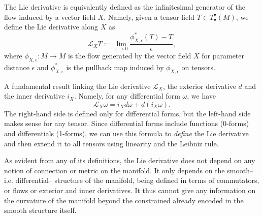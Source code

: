 \begin{mytheorem}
The Lie derivative is equivalently defined as the infinitesimal generator of the flow induced by a vector field \(X\).
Namely, given a tensor field \(T\in T^{\bullet}_{\bullet} (M)\), we define the Lie derivative along \(X\) as
\begin{equation}
    \mathcal{L}_X T := \lim_{\epsilon \to 0} \frac{\phi_{X,\epsilon}^* (T) - T}{ \epsilon},
\end{equation}
where \(\phi_{X,\epsilon}: M \to M\) is the flow generated by the vector field \(X\) for parameter distance \(\epsilon\) and \(\phi_{X,\epsilon}^*\) is the pullback map induced by \(\phi_{X,\epsilon}\) on tensors.
\end{mytheorem}


\begin{mytheorem}
A fundamental result linking the Lie derivative $\mathcal{L}_X$, the exterior derivative $d$ and the inner derivative $i_X$.
Namely, for any differential form $\omega$, we have
\begin{equation}
    \mathcal{L}_X \omega = i_X d \omega + d (i_X \omega).
\end{equation}
The right-hand side is defined only for differential forms, but the left-hand side makes sense for any tensor.
Since differential forms include functions (0-forms) and differentials (1-forms), we can use this formula to \emph{define} the Lie derivative and then extend it to all tensors using linearity and the Leibniz rule.
\end{mytheorem}

\begin{mytheorem}
As evident from any of its definitions, the Lie derivative does not depend on any notion of connection or metric on the manifold.
It only depends on the smooth-- i.e. differential-- structure of the manifold, being defined in terms of commutators, or flows or exterior and inner derivatives.
It thus cannot give any information on the curvature of the manifold beyond the constrained already encoded in the smooth structure itself.
\end{mytheorem}


